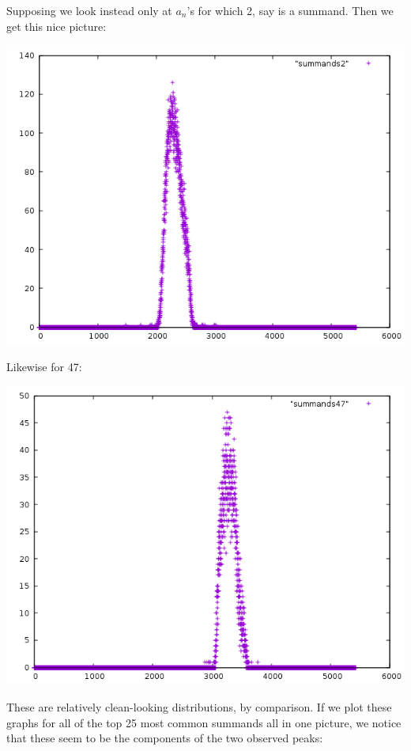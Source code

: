 \documentclass{article}
\theoremstyle{definition}
\theoremstyle{remark}
\numberwithin{equation}{section}
\begin{document}
Supposing we look instead only at $a_n$'s for which 2, say is a summand.  Then we get this nice picture:

\includegraphics[scale=0.5]{../figs/summands2.png}

Likewise for 47:

\includegraphics[scale=0.5]{../figs/summands47.png}

These are relatively clean-looking distributions, by comparison.  If
we plot these graphs for all of the top 25 most common summands all in
one picture, we notice that these seem to be the components of the two
observed peaks:
\end{document}
